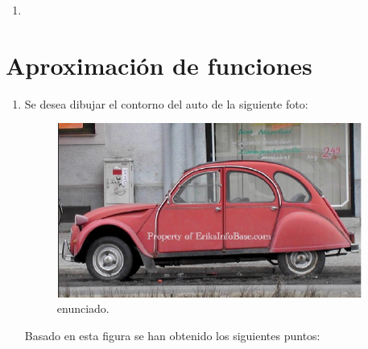 \documentclass{udpreport}
\begin{document}
\begin{enumerate}
\begin {enumerate}
\begin{enumerate}
\begin{itemize}
\begin{itemize}
				\end{itemize}
			\end{itemize}
			\item 
		\end{enumerate}
 	        
 	 \end{enumerate}
 \end{enumerate}


\newpage
\chapter{Aproximación de funciones} 
\begin{enumerate}
    
\vspace{0.9cm}
\item 

Se desea dibujar el contorno del auto de la siguiente foto:

\begin{figure}[H]
    \centering
    \includegraphics[width=10cm]{enun1}
    \caption{enunciado.} \label{fig:enun1}
\end{figure}


Basado en esta figura se han obtenido los siguientes puntos:



\begin{table}[H]
    \centering
        \begin{tabular} { |c|c|}
        

\end{tabular}
\end{table}
\end{enumerate}
\end{document}
